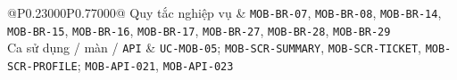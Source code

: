 \begin{longtable}{@{}P{0.23000\SRSWidth}P{0.77000\SRSWidth}@{}}
Quy tắc nghiệp vụ & \texttt{MOB-\allowbreak{}BR-\allowbreak{}07}, \texttt{MOB-\allowbreak{}BR-\allowbreak{}08}, \texttt{MOB-\allowbreak{}BR-\allowbreak{}14}, \texttt{MOB-\allowbreak{}BR-\allowbreak{}15}, \texttt{MOB-\allowbreak{}BR-\allowbreak{}16}, \texttt{MOB-\allowbreak{}BR-\allowbreak{}17}, \texttt{MOB-\allowbreak{}BR-\allowbreak{}27}, \texttt{MOB-\allowbreak{}BR-\allowbreak{}28}, \texttt{MOB-\allowbreak{}BR-\allowbreak{}29} \\[3pt]
Ca sử dụng /\allowbreak{} màn /\allowbreak{} \texttt{API} & \texttt{UC-\allowbreak{}MOB-\allowbreak{}05}; \texttt{MOB-\allowbreak{}SCR-\allowbreak{}SUMMARY}, \texttt{MOB-\allowbreak{}SCR-\allowbreak{}TICKET}, \texttt{MOB-\allowbreak{}SCR-\allowbreak{}PROFILE}; \texttt{MOB-\allowbreak{}API-\allowbreak{}021}, \texttt{MOB-\allowbreak{}API-\allowbreak{}023} \\[3pt]
\end{longtable}
\endgroup

